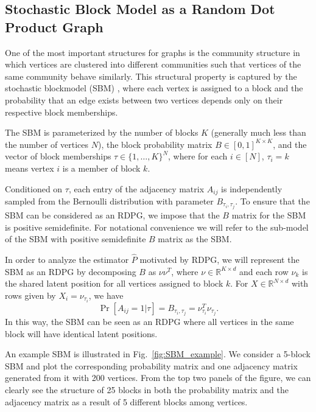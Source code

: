 \documentclass[10pt,letterpaper]{article}
\renewcommand{\Re}{\mathbb{R}}
\renewcommand{\hat}{\widehat}
\begin{document}
\subsection{Stochastic Block Model as a Random Dot Product Graph}
\label{section:sbm_rdpg}
One of the most important structures for graphs is the community structure in which vertices are clustered into different communities such that vertices of the same community behave similarly. This structural property is captured by the stochastic blockmodel (SBM) \citep{holland1983stochastic}, where each vertex is assigned to a block and the probability that an edge exists between two vertices depends only on their respective block memberships.

The SBM is parameterized by the number of blocks $K$ (generally much less than the number of vertices $N$), the block probability matrix $B \in [0,1]^{K \times K}$, and the vector of block memberships
$\tau\in\{1,\dotsc,K\}^N$, where for each $i \in [N]$, $\tau_i = k$ means vertex $i$ is a member of block $k$.

Conditioned on $\tau$, each entry of the adjacency matrix $A_{ij}$ is independently sampled from the Bernoulli distribution with parameter $B_{\tau_i,\tau_j}$.
To ensure that the SBM can be considered as an RDPG, we impose that the $B$ matrix for the SBM is positive semidefinite. 
For notational convenience we will refer to the sub-model of the SBM with positive semidefinite $B$ matrix as the SBM.

In order to analyze the estimator $\hat{P}$ motivated by RDPG, we will represent the SBM as an RDPG by
decomposing $B$ as $\nu \nu^T$, where $\nu \in \Re^{K \times d}$ and each row $\nu_k$ is the shared latent position for all vertices assigned to block $k$. 
For $X \in \Re^{N \times d}$ with rows given by $X_i = \nu_{\tau_i}$, we have
\[
    \Pr[A_{ij} = 1|\tau] = B_{\tau_i, \tau_j} = \nu_{\tau_i}^T \nu_{\tau_j}.
\]
In this way, the SBM can be seen as an RDPG where all vertices in the same block will have identical latent positions.

An example SBM is illustrated in Fig.~\ref{fig:SBM_example}.
We consider a 5-block SBM and plot the corresponding probability matrix and one adjacency matrix generated from it with 200 vertices. From the top two panels of the figure, we can clearly see the structure of 25 blocks in both the probability matrix and the adjacency matrix as a result of 5 different blocks among vertices.
\end{document}
